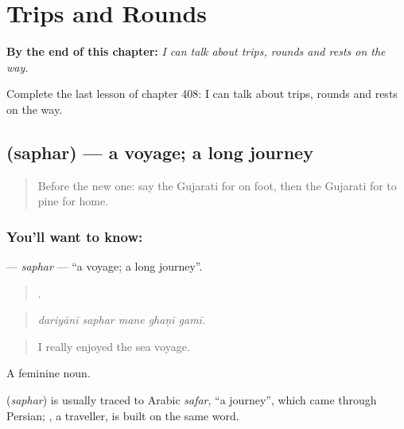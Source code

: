 
\chapter{Trips and Rounds}
\label{ch:gu-trips-and-rounds}

\begin{chapteropening}
\textbf{By the end of this chapter:} \emph{I can talk about trips, rounds and rests on the way.}

Complete the last lesson of chapter 408: I can talk about trips, rounds and rests on the way.
\end{chapteropening}

\section[\texorpdfstring{\gu{સફર} (saphar)}{સફર (saphar)}]{ (saphar) — a voyage; a long journey}

\label{lesson:GU-C408-saphar}



\begin{quote}
Before the new one: say the Gujarati for on foot, then the Gujarati for to pine for home.
\end{quote}

\subsection*{You'll want to know: }
\textbf{} — \emph{saphar} — \textquotedblleft{}a voyage; a long journey\textquotedblright{}.

\begin{quote}
    .
\end{quote}

\begin{quote}
\emph{dariyānī saphar mane ghaṇī gamī.}
\end{quote}

\begin{quote}
I really enjoyed the sea voyage.
\end{quote}

A feminine noun.

\begin{cousinweb}
\textbf{} (\emph{saphar}) is usually traced to Arabic \emph{safar}, \textquotedblleft{}a journey\textquotedblright{}, which came through Persian; , a traveller, is built on the same word.
\end{cousinweb}

